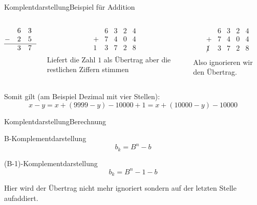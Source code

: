 \documentclass[xelatex,aspectratio=169]{beamer}
\begin{document}
\begin{frame}{Komplentdarstellung}{Beispiel für Addition}
  \begin{columns}[T]
    \begin{column}{0.33\textwidth}
      \centering
      \[
        \begin{matrix}
            & 6 & 3 & 2 & 4 \\
          - & 2 & 5 & 9 & 6 \\
          \hline
            & 3 & 7 & 2 & 8 \\
        \end{matrix}
      \]
    \end{column}
    \begin{column}{0.33\textwidth}
      \centering
      \[
        \begin{matrix}
            & 6 & 3 & 2 & 4 \\
          + & 7 & 4 & 0 & 4 \\
          \hline
          1 & 3 & 7 & 2 & 8 \\
        \end{matrix}
      \]
      Liefert die Zahl $1$ als Übertrag aber die restlichen Ziffern stimmen
    \end{column}
    \begin{column}{0.33\textwidth}
      \centering
      \[
        \begin{matrix}
                & 6 & 3 & 2 & 4 \\
          +     & 7 & 4 & 0 & 4 \\
          \hline
          \not1 & 3 & 7 & 2 & 8 \\
        \end{matrix}
      \]
      Also ignorieren wir den Übertrag.
    \end{column}
  \end{columns}
  \vspace{\baselineskip}
  Somit gilt (am Beispiel Dezimal mit vier Stellen):
  \[ x - y = x + (9999 - y) - 10000 + 1 = x + (10000 - y) - 10000\]

\end{frame}

\begin{frame}{Komplentdarstellung}{Berechnung}
  \begin{block}{B-Komplementdarstellung}
    \[b_k = B^n  - b\]
  \end{block}
  \begin{block}{(B-1)-Komplementdarstellung}
    \[b_k = B^n -1 - b\]

    Hier wird der Übertrag nicht mehr ignoriert sondern auf der letzten Stelle aufaddiert.
  \end{block}
\end{frame}


\end{document}
